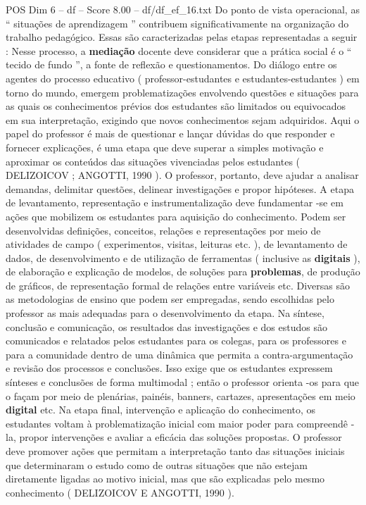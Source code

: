 \begin{textsample}{POS Dim 6 – df – Score 8.00 – df/df\_ef\_16.txt}
Do ponto de vista operacional, as “ situações de aprendizagem ” contribuem significativamente na organização do trabalho pedagógico.
Essas são caracterizadas pelas etapas representadas a seguir : Nesse processo, a \textbf{mediação} docente deve considerar que a prática social é o “ tecido de fundo ”, a fonte de reflexão e questionamentos.
Do diálogo entre os agentes do processo educativo ( professor-estudantes e estudantes-estudantes ) em torno do mundo, emergem problematizações envolvendo questões e situações para as quais os conhecimentos prévios dos estudantes são limitados ou equivocados em sua interpretação, exigindo que novos conhecimentos sejam adquiridos.
Aqui o papel do professor é mais de questionar e lançar dúvidas do que responder e fornecer explicações, é uma etapa que deve superar a simples motivação e aproximar os conteúdos das situações vivenciadas pelos estudantes ( DELIZOICOV ; ANGOTTI, 1990 ).
O professor, portanto, deve ajudar a analisar demandas, delimitar questões, delinear investigações e propor hipóteses.
A etapa de levantamento, representação e instrumentalização deve fundamentar -se em ações que mobilizem os estudantes para aquisição do conhecimento.
Podem ser desenvolvidas definições, conceitos, relações e representações por meio de atividades de campo ( experimentos, visitas, leituras etc. ), de levantamento de dados, de desenvolvimento e de utilização de ferramentas ( inclusive as \textbf{digitais} ), de elaboração e explicação de modelos, de soluções para \textbf{problemas}, de produção de gráficos, de representação formal de relações entre variáveis etc.
Diversas são as metodologias de ensino que podem ser empregadas, sendo escolhidas pelo professor as mais adequadas para o desenvolvimento da etapa.
Na síntese, conclusão e comunicação, os resultados das investigações e dos estudos são comunicados e relatados pelos estudantes para os colegas, para os professores e para a comunidade dentro de uma dinâmica que permita a contra-argumentação e revisão dos processos e conclusões.
Isso exige que os estudantes expressem sínteses e conclusões de forma multimodal ; então o professor orienta -os para que o façam por meio de plenárias, painéis, banners, cartazes, apresentações em meio \textbf{digital} etc.
Na etapa final, intervenção e aplicação do conhecimento, os estudantes voltam à problematização inicial com maior poder para compreendê -la, propor intervenções e avaliar a eficácia das soluções propostas.
O professor deve promover ações que permitam a interpretação tanto das situações iniciais que determinaram o estudo como de outras situações que não estejam diretamente ligadas ao motivo inicial, mas que são explicadas pelo mesmo conhecimento ( DELIZOICOV E ANGOTTI, 1990 ).

\end{textsample}
